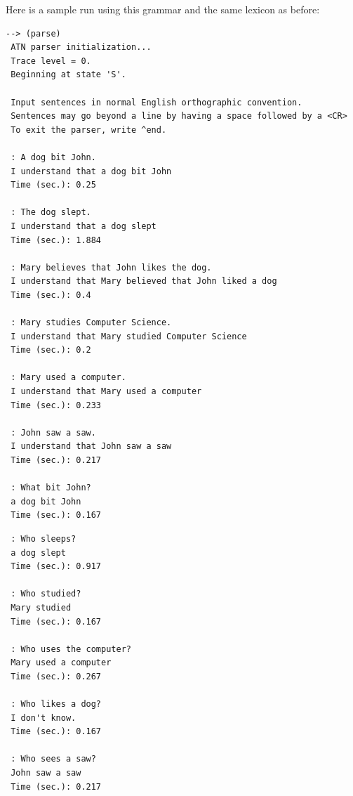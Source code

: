 \documentclass{book}
\begin{document}
Here is a sample run using this grammar and the same lexicon as before:
\begin{verbatim}
--> (parse)
 ATN parser initialization... 
 Trace level = 0.
 Beginning at state 'S'.

 Input sentences in normal English orthographic convention. 
 Sentences may go beyond a line by having a space followed by a <CR>
 To exit the parser, write ^end.

 : A dog bit John.
 I understand that a dog bit John
 Time (sec.): 0.25

 : The dog slept.
 I understand that a dog slept
 Time (sec.): 1.884

 : Mary believes that John likes the dog.
 I understand that Mary believed that John liked a dog
 Time (sec.): 0.4

 : Mary studies Computer Science.
 I understand that Mary studied Computer Science
 Time (sec.): 0.2

 : Mary used a computer.
 I understand that Mary used a computer
 Time (sec.): 0.233

 : John saw a saw.
 I understand that John saw a saw
 Time (sec.): 0.217

 : What bit John?
 a dog bit John
 Time (sec.): 0.167
\end{verbatim}
\pagebreak
\begin{verbatim}
 : Who sleeps?
 a dog slept
 Time (sec.): 0.917

 : Who studied?
 Mary studied
 Time (sec.): 0.167

 : Who uses the computer?
 Mary used a computer
 Time (sec.): 0.267

 : Who likes a dog?
 I don't know.
 Time (sec.): 0.167

 : Who sees a saw?
 John saw a saw
 Time (sec.): 0.217
\end{verbatim}
\end{document}
